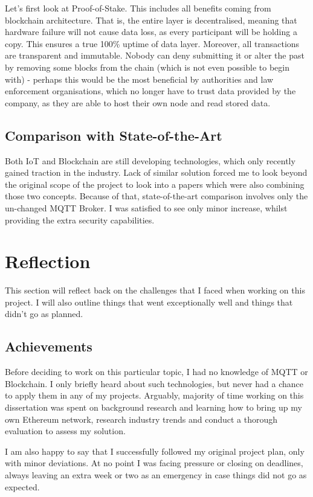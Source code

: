 Let's first look at Proof-of-Stake. This includes all benefits coming from blockchain architecture.  That is, the entire layer is decentralised, meaning that hardware failure will not cause data loss, as every participant will be holding a copy. This ensures a true 100\% uptime of data layer. Moreover, all transactions are transparent and immutable. Nobody can deny submitting it or alter the past by removing some blocks from the chain (which is not even possible to begin with) - perhaps this would be the most beneficial by authorities and law enforcement organisations, which no longer have to trust data provided by the company, as they are able to host their own node and read stored data.

\subsection{Comparison with State-of-the-Art}
Both IoT and Blockchain are still developing technologies, which only recently gained traction in the industry. Lack of similar solution forced me to look beyond the original scope of the project to look into a papers which were also combining those two concepts. Because of that, state-of-the-art comparison involves only the un-changed MQTT Broker. I was satisfied to see only minor increase, whilst providing the extra security capabilities.
\section{Reflection}
This section will reflect back on the challenges that I faced when working on this project. I will also outline things that went exceptionally well and things that didn't go as planned.
\subsection{Achievements}
Before deciding to work on this particular topic, I had no knowledge of MQTT or Blockchain. I only briefly heard about such technologies, but never had a chance to apply them in any of my projects. Arguably, majority of time working on this dissertation was spent on background research and learning how to bring up my own Ethereum network, research industry trends and conduct a thorough evaluation to assess my solution.

I am also happy to say that I successfully followed my original project plan, only with minor deviations. At no point I was facing pressure or closing on deadlines, always leaving an extra week or two as an emergency in case things did not go as expected.

